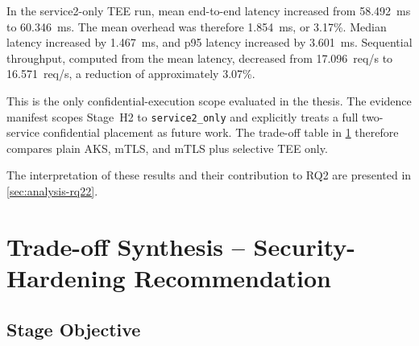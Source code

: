\begin{table}[ht]
\centering
\caption[Stage~H2 service2-only confidential execution results]{Stage~H2 service2-only confidential execution results. Source: per-pass \texttt{benchmark/raw\_iterations.csv} in \texttt{rq2\_2\_confidential\_20260516\_135726/conditions/}, aggregated across the five standard and five confidential passes (1,000 iterations per condition).}
\label{tab:rq22_service2_results}
\end{table}

In the service2-only TEE run, mean end-to-end latency increased from 58.492~ms
to 60.346~ms. The mean overhead was therefore 1.854~ms, or 3.17\%. Median
latency increased by 1.467~ms, and p95 latency increased by 3.601~ms.
Sequential throughput, computed from the mean latency, decreased from
17.096~req/s to 16.571~req/s, a reduction of approximately 3.07\%.

This is the only confidential-execution scope evaluated in the thesis. The
evidence manifest scopes Stage~H2 to \texttt{service2\_only} and explicitly treats
a full two-service confidential placement as future work. The trade-off table
in \cref{sec:rq23} therefore compares plain AKS, mTLS, and mTLS plus selective
TEE only.

The interpretation of these results and their contribution to RQ2 are presented in
\cref{sec:analysis-rq22}.

\section{Trade-off Synthesis -- Security-Hardening Recommendation}
\label{sec:rq23}

\subsection{Stage Objective}


